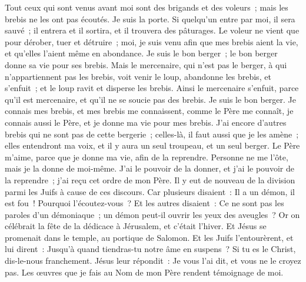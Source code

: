 \begin{multicols}{2}
Tout ceux qui sont venus avant moi sont des brigands et des voleurs~; mais les brebis ne les ont pas écoutés.
Je suis la porte. Si quelqu'un entre par moi, il sera sauvé~; il entrera et il sortira, et il trouvera des pâturages.
Le voleur ne vient que pour dérober, tuer et détruire~; moi, je suis venu afin que mes brebis aient la vie, et qu'elles l'aient même en abondance.
Je suis le bon berger~; le bon berger donne sa vie pour ses brebis.
Mais le mercenaire, qui n'est pas le berger, à qui n'appartiennent pas les brebis, voit venir le loup, abandonne les brebis, et s'enfuit~; et le loup ravit et disperse les brebis.
Ainsi le mercenaire s'enfuit, parce qu'il est mercenaire, et qu'il ne se soucie pas des brebis. Je suis le bon berger.
Je connais mes brebis, et mes brebis me connaissent,
comme le Père me connaît, je connais aussi le Père, et je donne ma vie pour mes brebis.
J'ai encore d'autres brebis qui ne sont pas de cette bergerie~; celles-là, il faut aussi que je les amène~; elles entendront ma voix, et il y aura un seul troupeau, et un seul berger.
Le Père m'aime, parce que je donne ma vie, afin de la reprendre.
Personne ne me l'ôte, mais je la donne de moi-même. J'ai le pouvoir de la donner, et j'ai le pouvoir de la reprendre~; j'ai reçu cet ordre de mon Père.
Il y eut de nouveau de la division parmi les Juifs à cause de ces discours.
Car plusieurs disaient~: Il a un démon, il est fou~! Pourquoi l'écoutez-vous~?
Et les autres disaient~: Ce ne sont pas les paroles d'un démoniaque~; un démon peut-il ouvrir les yeux des aveugles~?
Or on célébrait la fête de la dédicace à Jérusalem, et c'était l'hiver.
Et Jésus se promenait dans le temple, au portique de Salomon.
Et les Juifs l'entourèrent, et lui dirent~: Jusqu'à quand tiendras-tu notre âme en suspens~? Si tu es le Christ, dis-le-nous franchement.
Jésus leur répondit~: Je vous l'ai dit, et vous ne le croyez pas. Les œuvres que je fais au Nom de mon Père rendent témoignage de moi.

\end{multicols}

